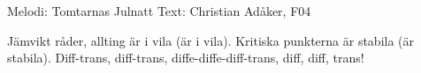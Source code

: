 \begin{song}

\begin{songmeta}
Melodi: Tomtarnas Julnatt
Text: Christian Adåker, F04
\end{songmeta}

\begin{songtext}
Jämvikt råder, allting är i vila (är i vila).
Kritiska punkterna är stabila (är stabila).
Diff-trans, diff-trans, diffe-diffe-diff-trans,
diff, diff, trans!
\end{songtext}

\end{song}
